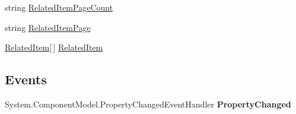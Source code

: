 \begin{DoxyCompactItemize}
\begin{DoxyCompactList}\small\item\em \end{DoxyCompactList}\item 
\hypertarget{class_price___comparison_1_1amazon_1_1ecs_1_1_related_items_a2f189e139b57f3f4d2fd2212f5ef5176}{string \hyperlink{class_price___comparison_1_1amazon_1_1ecs_1_1_related_items_a2f189e139b57f3f4d2fd2212f5ef5176}{Related\-Item\-Page\-Count}}\label{class_price___comparison_1_1amazon_1_1ecs_1_1_related_items_a2f189e139b57f3f4d2fd2212f5ef5176}

\begin{DoxyCompactList}\small\item\em \end{DoxyCompactList}\item 
\hypertarget{class_price___comparison_1_1amazon_1_1ecs_1_1_related_items_a70d12ca3a2f508d19debff78552264f4}{string \hyperlink{class_price___comparison_1_1amazon_1_1ecs_1_1_related_items_a70d12ca3a2f508d19debff78552264f4}{Related\-Item\-Page}}\label{class_price___comparison_1_1amazon_1_1ecs_1_1_related_items_a70d12ca3a2f508d19debff78552264f4}

\begin{DoxyCompactList}\small\item\em \end{DoxyCompactList}\item 
\hypertarget{class_price___comparison_1_1amazon_1_1ecs_1_1_related_items_a0b26bce9de3b4e44b43f5372b0310767}{\hyperlink{class_price___comparison_1_1amazon_1_1ecs_1_1_related_item}{Related\-Item}\mbox{[}$\,$\mbox{]} \hyperlink{class_price___comparison_1_1amazon_1_1ecs_1_1_related_items_a0b26bce9de3b4e44b43f5372b0310767}{Related\-Item}}\label{class_price___comparison_1_1amazon_1_1ecs_1_1_related_items_a0b26bce9de3b4e44b43f5372b0310767}

\begin{DoxyCompactList}\small\item\em \end{DoxyCompactList}\end{DoxyCompactItemize}
\subsection*{Events}
\begin{DoxyCompactItemize}
\item 
\hypertarget{class_price___comparison_1_1amazon_1_1ecs_1_1_related_items_a45e2d4dc3a272b1ae75d648bb6aa5ac8}{System.\-Component\-Model.\-Property\-Changed\-Event\-Handler {\bfseries Property\-Changed}}\label{class_price___comparison_1_1amazon_1_1ecs_1_1_related_items_a45e2d4dc3a272b1ae75d648bb6aa5ac8}

\end{DoxyCompactItemize}
